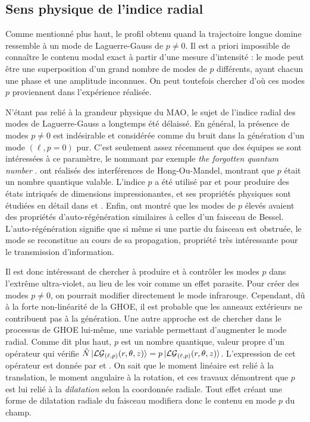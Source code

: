 \subsection{Sens physique de l'indice radial}
Comme mentionné plus haut, le profil obtenu quand la trajectoire longue domine ressemble à un mode de Laguerre-Gauss de $p\neq 0$. Il est a priori impossible de connaître le contenu modal exact à partir d'une mesure d'intensité : le mode peut être une superposition d'un grand nombre de modes de $p$ différents, ayant chacun une phase et une amplitude inconnues. On peut toutefois chercher d'où ces modes $p$ proviennent dans l'expérience réalisée.

N'étant pas relié à la grandeur physique du MAO, le sujet de l'indice radial des modes de Laguerre-Gauss a longtemps été délaissé. En général, la présence de modes $p\neq 0$ est indésirable et considérée comme du bruit dans la génération d'un mode $(\ell,p=0)$ pur. C'est seulement assez récemment que des équipes se sont intéressées à ce paramètre, le nommant par exemple \textit{the forgotten quantum number} .  ont réalisés des interférences de Hong-Ou-Mandel, montrant que $p$ était un nombre quantique valable. L'indice $p$ a été utilisé par  et  pour produire des états intriqués de dimensions impressionantes, et ses propriétés physiques sont étudiées en détail dans  et 	. Enfin,  ont montré que les modes de $p$ élevés avaient des propriétés d'auto-régénération similaires à celles d'un faisceau de Bessel. L'auto-régénération signifie que si même si une partie du faisceau est obstruée, le mode se reconstitue au cours de sa propagation, propriété très intéressante pour le transmission d'information.

Il est donc intéressant de chercher à produire et à contrôler les modes $p$ dans l'extrême ultra-violet, au lieu de les voir comme un effet parasite. Pour créer des modes $p\neq 0$, on pourrait modifier directement le mode infrarouge. Cependant, dû à la forte non-linéarité de la GHOE, il est probable que les anneaux extérieurs ne contribuent pas à la génération. Une autre approche est de chercher dans le processus de GHOE lui-même, une variable permettant d'augmenter le mode radial. Comme dit plus haut, $p$ est un nombre quantique, valeur propre d'un opérateur qui vérifie $\hat{N}\ket{\mathcal{LG}_{(\ell,p)}(r,\theta,z)} = p\ket{\mathcal{LG}_{(\ell,p)}(r,\theta,z)}$. L'expression de cet opérateur est donnée par  et . On sait que le moment linéaire est relié à la translation, le moment angulaire à la rotation, et ces travaux démontrent que $p$ est lui relié à la \textit{dilatation} selon la coordonnée radiale. Tout effet créant une forme de dilatation radiale du faisceau modifiera donc le contenu en mode $p$ du champ.


